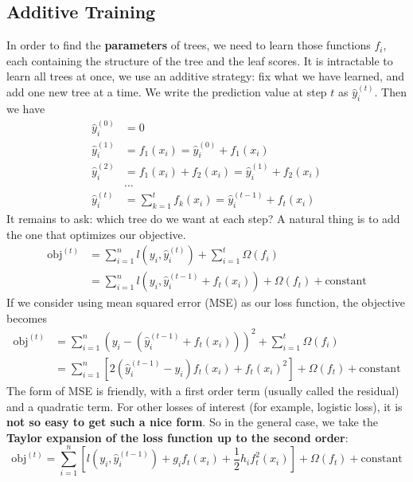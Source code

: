 \documentclass[a4paper, 12pt]{book} %
\begin{document}
\subsection{Additive Training}
In order to find the \textbf{parameters} of trees, we need to learn those functions $f_i$, each containing the structure of the tree and the leaf scores. It is intractable to learn all trees at once, we use an additive strategy: fix what we have learned, and add one new tree at a time. We write the prediction value at step $t$ as $\hat{y}_i^{(t)}$. Then we have 
\begin{equation}
\begin{split}\hat{y}_i^{(0)} &= 0\\
\hat{y}_i^{(1)} &= f_1(x_i) = \hat{y}_i^{(0)} + f_1(x_i)\\
\hat{y}_i^{(2)} &= f_1(x_i) + f_2(x_i)= \hat{y}_i^{(1)} + f_2(x_i)\\
&\dots\\
\hat{y}_i^{(t)} &= \sum_{k=1}^t f_k(x_i)= \hat{y}_i^{(t-1)} + f_t(x_i)\end{split}
\end{equation}
It remains to ask: which tree do we want at each step? A natural thing is to add the one that optimizes our objective.
\begin{equation}
\begin{split}\mathrm{obj}^{(t)} & = \sum_{i=1}^n l(y_i, \hat{y}_i^{(t)}) + \sum_{i=1}^t\Omega(f_i) \\
& = \sum_{i=1}^n l(y_i, \hat{y}_i^{(t-1)} + f_t(x_i)) + \Omega(f_t) + \mathrm{constant}\end{split}
\end{equation}
If we consider using mean squared error (MSE) as our loss function, the objective becomes
\begin{equation}
\begin{split}\mathrm{obj}^{(t)} & = \sum_{i=1}^n (y_i - (\hat{y}_i^{(t-1)} + f_t(x_i)))^2 + \sum_{i=1}^t\Omega(f_i) \\
& = \sum_{i=1}^n [2(\hat{y}_i^{(t-1)} - y_i)f_t(x_i) + f_t(x_i)^2] + \Omega(f_t) + \mathrm{constant}\end{split}
\end{equation}
The form of MSE is friendly, with a first order term (usually called the residual) and a quadratic term. For other losses of interest (for example, logistic loss), it is \textbf{not so easy to get such a nice form}. So in the general case, we take the \textbf{Taylor expansion of the loss function up to the second order}:
\begin{equation}
\mathrm{obj}^{(t)} = \sum_{i=1}^n [l(y_i, \hat{y}_i^{(t-1)}) + g_i f_t(x_i) + \frac{1}{2} h_i f_t^2(x_i)] + \Omega(f_t) + \mathrm{constant}
\end{equation}
\end{document}
